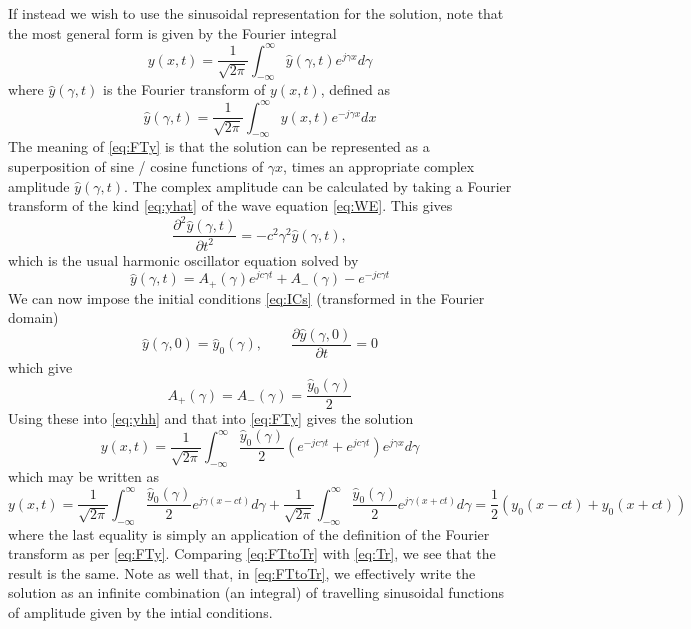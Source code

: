 If instead we wish to use the sinusoidal representation for the solution, note that the most general form is given by the Fourier integral
\begin{equation}\label{eq:FTy}
y(x,t) = \frac{1}{\sqrt{2\pi}} \int_{-\infty}^{\infty} \hat y(\gamma,t) e^{j\gamma x}d\gamma
\end{equation}
where $\hat y(\gamma,t)$ is the Fourier transform of $y(x,t)$, defined as
\begin{equation}\label{eq:yhat}
\hat y(\gamma,t) = \frac{1}{\sqrt{2\pi}} \int_{-\infty}^{\infty}  y(x,t) e^{-j\gamma x}d x
\end{equation}
The meaning of \eqref{eq:FTy} is that the solution can be represented as a superposition of sine / cosine functions of $\gamma x$, times an appropriate complex amplitude $\hat y(\gamma,t)$. The complex amplitude can be calculated by taking a Fourier transform of the kind \eqref{eq:yhat} of the wave equation \eqref{eq:WE}. This gives
\begin{equation}
\frac{\partial^2 \hat y(\gamma,t)}{\partial t^2} = - c^2\gamma^2 \hat y(\gamma,t),
\end{equation}
which is the usual harmonic oscillator equation solved by
\begin{equation}\label{eq:yhh}
\hat y(\gamma,t) = A_+(\gamma) e^{jc\gamma t} + A_-(\gamma)-e^{-jc\gamma t} 
\end{equation}
We can now impose the initial conditions \eqref{eq:ICs} (transformed in the Fourier domain)
\begin{equation}
\hat y(\gamma,0) = \hat y_0(\gamma), \qquad \frac{\partial \hat y (\gamma,0)}{\partial t} = 0
\end{equation}
which give
\begin{equation}
A_+(\gamma) = A_-(\gamma) = \frac{\hat y_0(\gamma)}{2}
\end{equation}
Using these into \eqref{eq:yhh} and that into \eqref{eq:FTy} gives the solution 
\begin{equation}
y(x,t) = \frac{1}{\sqrt{2\pi}} \int_{-\infty}^{\infty}\frac{\hat y_0(\gamma)}{2} \left( e^{-j c\gamma t} + e^{j c\gamma t} \right) e^{j\gamma x} d\gamma 
\end{equation}
which may be written as
\begin{equation}\label{eq:FTtoTr}
y(x,t) = \frac{1}{\sqrt{2\pi}} \int_{-\infty}^{\infty}\frac{\hat y_0(\gamma)}{2}  e^{j\gamma (x - c  t)}d\gamma +  \frac{1}{\sqrt{2\pi}} \int_{-\infty}^{\infty}\frac{\hat y_0(\gamma)}{2}  e^{j\gamma (x + c  t)}d\gamma  = \frac{1}{2}\left( y_0(x-ct) + y_0(x+ct)\right)
\end{equation}
where the last equality is simply an application of the definition of the Fourier transform as per \eqref{eq:FTy}. Comparing \eqref{eq:FTtoTr} with \eqref{eq:Tr}, we see that the result is the same. Note as well that, in \eqref{eq:FTtoTr}, we effectively write the solution as an infinite combination (an integral) of travelling sinusoidal functions of amplitude given by the intial conditions.

